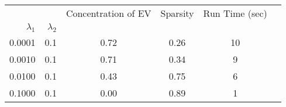\begin{tabular}{rr|cccc}
\toprule
       &     &  Concentration of EV &  Sparsity & Run Time (sec) \\
$\lambda_1$ & $\lambda_2$ &                      &           &                \\
\midrule
0.0001 & 0.1 &                 0.72 &      0.26 &             10 \\
0.0010 & 0.1 &                 0.71 &      0.34 &              9 \\
0.0100 & 0.1 &                 0.43 &      0.75 &              6 \\
0.1000 & 0.1 &                 0.00 &      0.89 &              1 \\
\bottomrule
\end{tabular}
